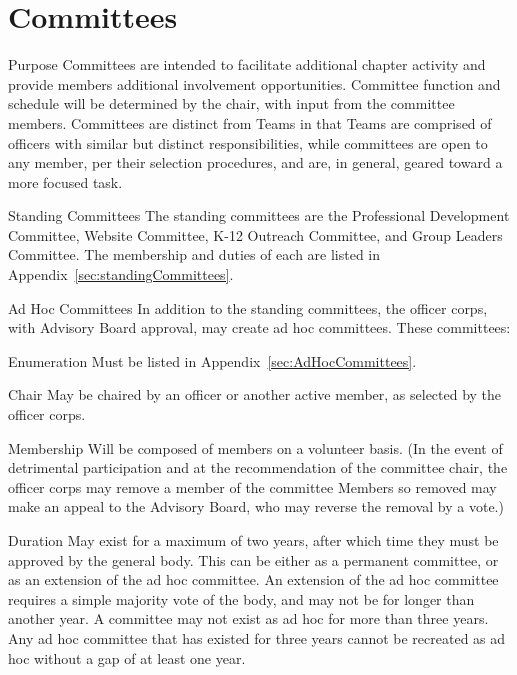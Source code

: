 \section{Committees} %
\begin{enumsubsection}
\item{Purpose} Committees are intended to facilitate additional chapter activity and provide members additional involvement opportunities.  Committee function and schedule will be determined by the chair, with input from the committee members. Committees are distinct from Teams in that Teams are comprised of officers with similar but distinct responsibilities, while committees are open to any member, per their selection procedures, and are, in general,  geared toward a more focused task.
\item{Standing Committees} The standing committees are the Professional Development Committee, Website Committee, K-12 Outreach Committee, and Group Leaders Committee. The membership and duties of each are listed in Appendix~\ref{sec:standingCommittees}. %
\item{Ad Hoc Committees}\label{sec:AdHocCommitteeCreation} In addition to the standing committees, the officer corps, with Advisory Board approval, may create ad hoc committees. These committees:
\begin{enumsubsubsection}
\item*{Enumeration} Must be listed in Appendix~\ref{sec:AdHocCommittees}.
\item*{Chair} May be chaired by an officer or another active member, as selected by the officer corps. 
\item*{Membership} Will be composed of  members on a volunteer basis. (In the event of detrimental participation and at the recommendation of the committee chair, the officer corps may remove a member of the committee Members so removed may make an appeal to the Advisory Board, who may reverse the removal by a  vote.)
\item*{Duration} May exist for a maximum of two years, after which time they must be approved by the general body. This can be either as a permanent committee, or as an extension of the ad hoc committee. An extension of the ad hoc committee requires a simple majority vote of the body, and may not be for longer than another year. A committee may not exist as ad hoc for more than three years. Any ad hoc committee that has existed for three years cannot be recreated as ad hoc without a gap of at least one year.
\end{enumsubsubsection}
\end{enumsubsection}

